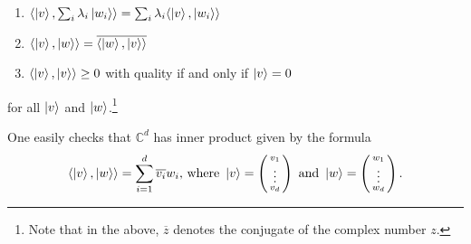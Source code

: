 \begin{enumerate}
\item $\langle\ket{v}, \sum_i \lambda_i \ket{w_i}\rangle=\sum_i \lambda_i \langle\ket{v}, \ket{w_i}\rangle$
\item $\langle\ket{v}, \ket{w}\rangle=\overline{\langle\ket{w}, \ket{v}\rangle}$
\item $\langle\ket{v}, \ket{v}\rangle \ge 0$ \textrm{ with quality if and only if }$\ket{v}=0$
\end{enumerate}
for all $\ket{v}$ and $\ket{w}$.\footnote{Note that in the above, $\overline{z}$ denotes the conjugate of the complex number $z$.} 

One easily checks that $\mathbb{C}^d$ has inner product given by the formula
\begin{equation} \label{inner product defn}
  \langle \ket{v},\ket{w}\rangle=\sum\limits_{i=1}^d \overline{v_i} w_i \textrm{, where }
  \ket{v}=\left(\begin{smallmatrix}v_1\\ \vdots\\v_d\end{smallmatrix}\right) \textrm{ and }\ket{w}=\left(\begin{smallmatrix}w_1\\ \vdots\\w_d\end{smallmatrix}\right).
\end{equation}

